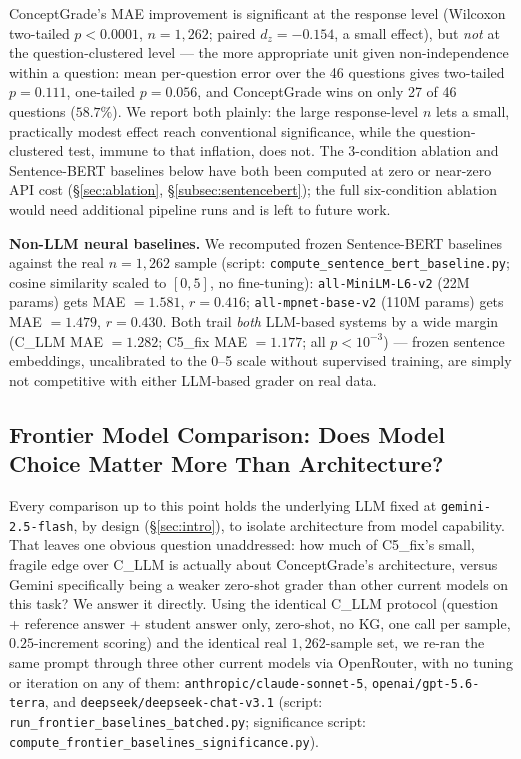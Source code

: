 \documentclass[conference]{IEEEtran}
\begin{document}
ConceptGrade's MAE improvement is significant at the response level
(Wilcoxon two-tailed $p<0.0001$, $n=1{,}262$; paired $d_z=-0.154$, a
small effect), but \emph{not} at the question-clustered level --- the
more appropriate unit given non-independence within a question: mean
per-question error over the 46 questions gives two-tailed $p=0.111$,
one-tailed $p=0.056$, and ConceptGrade wins on only 27 of 46 questions
($58.7\%$). We report both plainly: the large response-level $n$ lets
a small, practically modest effect reach conventional significance,
while the question-clustered test, immune to that inflation, does not.
The 3-condition ablation and Sentence-BERT baselines below have both
been computed at zero or near-zero API cost (\S\ref{sec:ablation},
\S\ref{subsec:sentencebert}); the full six-condition ablation would
need additional pipeline runs and is left to future work.

\textbf{Non-LLM neural baselines.}
\label{subsec:sentencebert}
We recomputed frozen Sentence-BERT baselines against the real
$n=1{,}262$ sample (script:
\texttt{compute\_sentence\_bert\_baseline.py}; cosine similarity
scaled to $[0,5]$, no fine-tuning): \texttt{all-MiniLM-L6-v2} (22M
params) gets MAE $=1.581$, $r=0.416$; \texttt{all-mpnet-base-v2} (110M
params) gets MAE $=1.479$, $r=0.430$. Both trail \emph{both}
LLM-based systems by a wide margin (C\_LLM MAE $=1.282$; C5\_fix MAE
$=1.177$; all $p<10^{-3}$) --- frozen sentence embeddings,
uncalibrated to the 0--5 scale without supervised training, are simply
not competitive with either LLM-based grader on real data.

\subsection{Frontier Model Comparison: Does Model Choice Matter More Than Architecture?}
\label{subsec:frontier}

Every comparison up to this point holds the underlying LLM fixed at
\texttt{gemini-2.5-flash}, by design (\S\ref{sec:intro}), to isolate
architecture from model capability. That leaves one obvious question
unaddressed: how much of C5\_fix's small, fragile edge over C\_LLM is
actually about ConceptGrade's architecture, versus Gemini specifically
being a weaker zero-shot grader than other current models on this
task? We answer it directly. Using the identical C\_LLM protocol
(question + reference answer + student answer only, zero-shot, no KG,
one call per sample, $0.25$-increment scoring) and the identical real
$1{,}262$-sample set, we re-ran the same prompt through three other
current models via OpenRouter, with no tuning or iteration on any of
them: \texttt{anthropic/claude-sonnet-5}, \texttt{openai/gpt-5.6-terra},
and \texttt{deepseek/deepseek-chat-v3.1} (script:
\texttt{run\_frontier\_baselines\_batched.py}; significance script:
\texttt{compute\_frontier\_baselines\_significance.py}).
\end{document}
